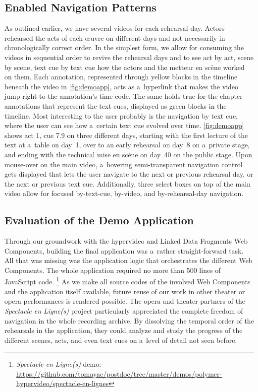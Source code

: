 \documentclass[runningheads,a4paper]{llncs}
\begin{document}
\subsection{Enabled Navigation Patterns}

As outlined earlier, we have several videos for each rehearsal day.
Actors rehearsed the acts of each œuvre on different days
and not necessarily in chronologically correct order.
In the simplest form, we allow for consuming the videos in sequential order
to revive the rehearsal days and to see act by act, scene by scene, text cue by text cue
how the actors and the metteur en scène worked on them.
Each annotation, represented through yellow blocks in the timeline beneath the video
in \autoref{fig:demoapp}, acts as a~hyperlink
that makes the video jump right to the annotation's time code.
The same holds true for the chapter annotations that represent the text cues,
displayed as green blocks in the timeline.
Most interesting to the user probably is the navigation by text cue,
where the user can see how a~certain text cue evolved over time.
\autoref{fig:demoapp} shows act 1, cue 7.9 on three different days,
starting with the first lecture of the text at a~table on day~1,
over to an early rehearsal on day~8 on a~private stage,
and ending with the technical mise en scène on day~40 on the public stage.
Upon mouse-over on the main video, a~hovering semi-transparent navigation control gets displayed
that lets the user navigate to the next or previous rehearsal day,
or the next or previous text cue.
Additionally, three select boxes on top of the main video allow for focused
by-text-cue, by-video, and by-rehearsal-day navigation.

\subsection{Evaluation of the Demo Application}
\label{sec:evaluationo-of-the-demo-application}

Through our groundwork with the hypervideo and Linked Data Fragments Web Components, 
building the final application was a~rather straight-forward task.
All that was missing was the application logic that orchestrates the different Web Components.
The whole application required no more than 500 lines of JavaScript code.%
\footnote{\emph{Spectacle en Ligne(s)} demo:
\url{https://github.com/tomayac/postdoc/tree/master/demos/polymer-hypervideo/spectacle-en-lignes}}
As we make all source codes of the involved Web Components and the application itself available,
future reuse of our work in other theater or opera performances is rendered possible.
The opera and theater partners of the \emph{Spectacle en Ligne(s)} project
particularly appreciated the complete freedom of navigation in the whole recording archive.
By dissolving the temporal order of the rehearsals in the application,
they could analyze and study the progress of the different scenes, acts,
and even text cues on a~level of detail not seen before. 
\end{document}
